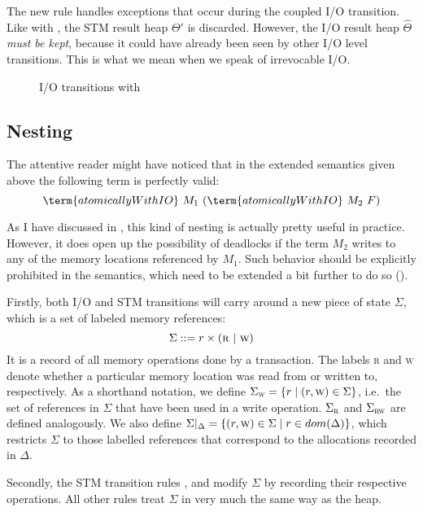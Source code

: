 The new rule  handles exceptions that occur during the coupled I/O transition.
Like with , the STM result heap $\Theta'$ is discarded.
However, the I/O result heap $\hat{\Theta}$ \emph{must be kept}, because it could have already been seen by other I/O level transitions.
This is what we mean when we speak of irrevocable I/O.

\begin{figure}[!h]

\caption{I/O transitions with }
\label{fig:step1-io}
\end{figure}

\clearpage


\subsection{Nesting}

The attentive reader might have noticed that in the extended semantics given above the following term is perfectly valid:
$$
\term{atomicallyWithIO}\ M_1\ (\term{atomicallyWithIO}\ M_2\ F)
$$

As I have discussed in , this kind of nesting is actually pretty useful in practice.
However, it does open up the possibility of deadlocks if the term $M_2$ writes to any of the memory locations referenced by $M_1$.
Such behavior should be explicitly prohibited in the semantics, which need to be extended a bit further to do so ().

Firstly, both I/O and STM transitions will carry around a new piece of state $\Sigma$, which is a set of labeled memory references:
$$
\Sigma ::= r \times (\textsc{r}\ \vert\ \textsc{w})
$$
It is a record of all memory operations done by a transaction.
The labels \textsc{r} and \textsc{w} denote whether a particular memory location was read from or written to, respectively.
As a shorthand notation, we define $\Sigma_\textsc{w}=\{r \mid (r,\textsc{w}) \in \Sigma\}$, i.e.\ the set of references in $\Sigma$ that have been used in a write operation.
$\Sigma_\textsc{r}$ and $\Sigma_\textsc{rw}$ are defined analogously.
We also define $\Sigma\vert_\Delta=\{ (r,\textsc{w}) \in \Sigma \mid r \in dom(\Delta)\}$, which restricts $\Sigma$ to those labelled references that correspond to the allocations recorded in $\Delta$.

Secondly, the STM transition rules ,  and  modify $\Sigma$ by recording their respective operations.
All other rules treat $\Sigma$ in very much the same way as the heap.

